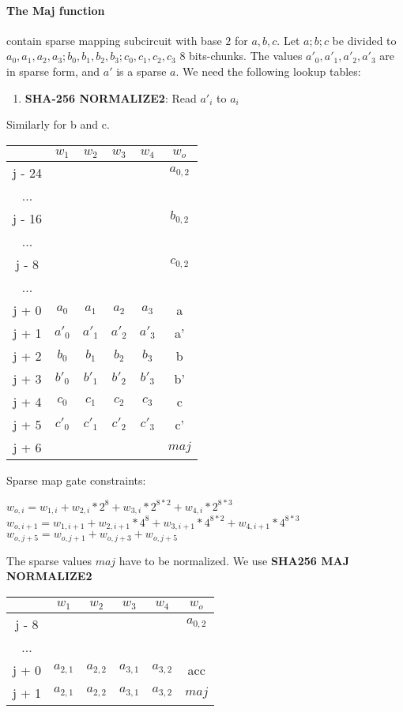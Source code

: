 \paragraph{The Maj function}
contain sparse mapping subcircuit with base $2$ for $a, b ,c$.
Let $a; b; c$ be divided to $a_0, a_1, a_2, a_3; b_0, b_1, b_2, b_3; c_0, c_1, c_2, c_3$ 8 bits-chunks.
The values $a'_0, a'_1, a'_2, a'_3$ are in sparse form, and $a'$ is a sparse $a$.
We need the following lookup tables:
\begin{enumerate}
\item \textbf{SHA-256 NORMALIZE2}: Read $a'_i$ to $a_i$
\end{enumerate}
Similarly for b and c. 
\begin{center}
\begin{tabular}{ |c|c|c|c|c|c } 
  & $w_1$ & $w_2$ & $w_3$ & $w_4$ & $w_o$\\ 
 \hline
j - 24 &  &  &  &  & $a_{0, 2}$\\ 
... &&&&& \\
j - 16 &  &  &  &  & $b_{0, 2}$\\ 
... &&&&& \\
j - 8 &  &  &  &  & $c_{0, 2}$\\ 
... &&&&& \\
j + 0 & $a_0$ & $ a_1$ & $a_2$ & $a_3$ & a\\ 
j + 1 & $a'_0$ & $a'_1$ & $a'_2$ & $a'_3$ & a' \\ 
j + 2 & $b_0$ & $ b_1$ & $b_2$ & $b_3$ & b\\ 
j + 3 & $b'_0$ & $b'_1$ & $b'_2$ & $b'_3$ & b' \\ 
j + 4 & $c_0$ & $ c_1$ & $c_2$ & $c_3$ & c\\ 
j + 5 & $c'_0$ & $c'_1$ & $c'_2$ & $c'_3$ & c' \\ 
j + 6 & &  &  &  & $maj$ \\ 
 \hline
\end{tabular}
\end{center}
Sparse map gate constraints:
\begin{center}
$w_{o,i} = w_{1,i} + w_{2,i}*2^8 + w_{3,i}*2^{8*2} + w_{4,i}*2^{8*3}$ \\
$w_{o,i+1} = w_{1,i+1} + w_{2,i+1}*4^8 + w_{3,i+1}*4^{8*2} + w_{4,i+1}*4^{8*3}$ \\

$w_{o, j+5} = w_{o,j+1} + w_{o, j+3} + w_{o, j+5}$ \\
\end{center}

The sparse values $maj$ have to be normalized.
We use \textbf{SHA256 MAJ NORMALIZE2}
\begin{center}
\begin{tabular}{ |c|c|c|c|c|c } 
  & $w_1$ & $w_2$ & $w_3$ & $w_4$ & $w_o$\\ 
 \hline
j - 8 &  &  &  &  & $a_{0, 2}$\\ 
... &&&&& \\
j + 0 & $a_{2,1}$ & $ a_{2,2}$ & $a_{3,1}$ & $a_{3,2}$ & acc\\ 
j + 1 & $a_{2,1}$ & $ a_{2,2}$ & $a_{3,1}$ & $a_{3,2}$ & $maj$ \\ 
 \hline
\end{tabular}
\end{center}

